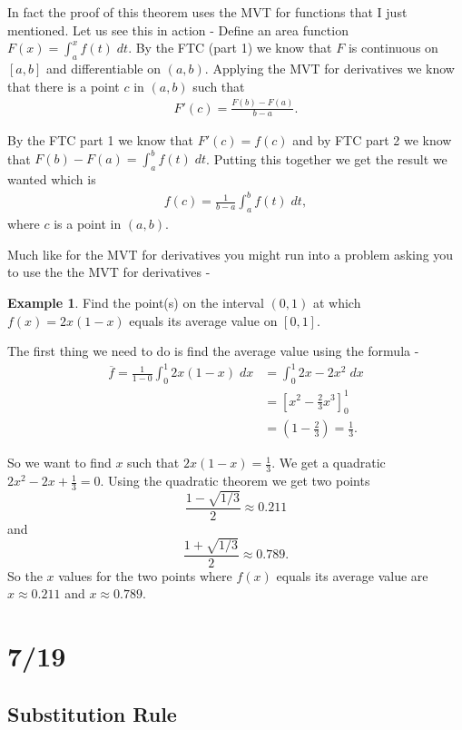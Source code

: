 \documentclass[12pt,reqno]{article}
\theoremstyle{definition}
\newtheorem*{Example}{Example}
\begin{document}
In fact the proof of this theorem uses the MVT for functions that I just mentioned. Let us see this in action - Define an area function $F(x) = \int_{a}^{x} f(t)\;dt$. By the FTC (part 1) we know that $F$ is continuous on $[a, b]$ and differentiable on $(a, b)$. Applying the MVT for derivatives we know that there is a point $c$ in $(a, b)$ such that 
\begin{align*}
	F'(c) = \frac{F(b) - F(a)}{ b - a}. 
\end{align*}

By the FTC part 1 we know that $F'(c) = f(c)$ and by FTC part 2 we know that $F(b) - F(a) = \int_{a}^{b} f(t) \;dt$. Putting this together we get the result we wanted which is 
\begin{align*}
	f(c) = \frac{1}{b - a} \int_{a}^{b} f(t) \; dt,
\end{align*}
where $c$ is a point in $(a, b)$. 


Much like for the MVT for derivatives you might run into a problem asking you to use the the MVT for derivatives - 
\begin{Example}
	Find the point(s) on the interval $(0, 1)$ at which $f(x) = 2x(1 - x)$ equals its average value on $[0, 1]$. 
	
	The first thing we need to do is find the average value using the formula - 
	\begin{align*}
		\overline{f} = \frac{1}{1 - 0} \int_{0}^{1} 2x(1 - x) \; dx &= \int_{0}^{1} 2x - 2x^2 \;dx \\
		&= \left[x^2 - \frac{2}{3} x^3 \right]_{0}^{1}  \\
		&= \left(1 - \frac{2}{3} \right) = \frac{1}{3}.
	\end{align*}

	So we want to find $x$ such that $2x (1 - x) = \frac{1}{3}$. We get a quadratic $2x^2 - 2x + \frac{1}{3} = 0$. Using the quadratic theorem we get two points $$\frac{1 - \sqrt{1/3}}{2} \approx 0.211$$ and $$\frac{1 + \sqrt{1/3}}{2} \approx 0.789.$$ So the $x$ values for the two points where $f(x)$ equals its average value are $x \approx 0.211$ and $x \approx 0.789$. 
\end{Example}

\section{7/19}
\subsection{Substitution Rule} 
\end{document}
